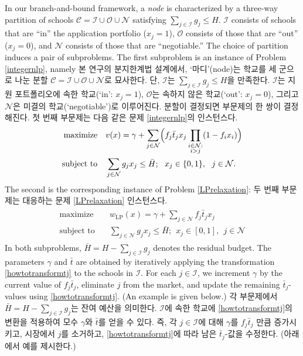 \documentclass[11pt]{article} %
\theoremstyle{definition}
\theoremstyle{definition}
\begin{document}
\ifen In our branch-and-bound framework, a \emph{node} is characterized by a three-way partition of schools $\mathcal{C}= \mathcal{I} \cup \mathcal{O} \cup \mathcal{N}$ satisfying $\sum_{j \in \mathcal{I}} g_j \leq H$. $\mathcal{I}$ consists of schools that are ``in'' the application portfolio ($x_j = 1$), $\mathcal{O}$ consists of those that are ``out'' ($x_j = 0$), and $\mathcal{N}$ consists of those that are ``negotiable.'' 
The choice of partition induces a pair of subproblems. The first subproblem is an instance of Problem \ref{integernlp}, namely
\else
본 연구의 분지한계법 설계에서, `마디'(node)는 학교를 세 군으로 나눈 분할 $\mathcal{C}= \mathcal{I} \cup \mathcal{O} \cup \mathcal{N}$로 묘사한다. 단, $\mathcal{I}$는 $\sum_{j \in \mathcal{I}} g_j \leq H$을 만족한다. $\mathcal{I}$는 지원 포트폴리오에 속한 학교(`in': $x_j = 1$), $\mathcal{O}$는 속하지 않은 학교(`out': $x_j = 0$), 그리고 $\mathcal{N}$은 미결의 학교(`negotiable')로 이루어진다. 분할이 결정되면 부문제의 한 쌍이 결정해진다. 첫 번째 부문제는 다음 같은 문제 \ref{integernlp}의 인스턴스다.
\fi
\begin{align} \label{nodenlpsubproblem}
\begin{split}
\text{maximize}\quad &  v(x) = \gamma + \sum_{j \in \mathcal{N}} \Bigl(f_j \bar t_j x_j \prod_{\substack{i \in \mathcal{N}:\\i > j}} (1 - f_{i} x_i) \Bigr)\\
\text{subject to}\quad & \sum_{j \in \mathcal{N}} g_j x_j \leq \bar H; ~~ x_j \in \{0, 1\},~~j \in \mathcal{N}.
\end{split}
\end{align}
\ifen The second is the corresponding instance of Problem \ref{LPrelaxation}:
\else 두 번째 부문제는 대응하는 문제 \ref{LPrelaxation} 인스턴스다.\fi
\begin{align} \label{nodelprelaxation}
\begin{split}
\text{maximize}\quad &  w_{\mathrm{LP}}(x)= \gamma + \sum_{j \in \mathcal{N}}  f_j \bar t_j  x_j \\
\text{subject to}\quad & \sum_{j \in \mathcal{N}} g_j x_j \leq \bar H; ~~ x_j \in [0, 1],~~j \in \mathcal{N}
\end{split}
\end{align}
\ifen
In both subproblems, $\bar H = H - \sum_{j\in \mathcal{I}} g_j$ denotes the residual budget. The parameters $\gamma$ and $\bar t$ are obtained by iteratively applying the transformation \eqref{howtotransformtj} to the schools in $\mathcal{I}$. For each $j\in \mathcal{I}$,  we increment $\gamma$ by the current value of $f_j \bar t_j$, eliminate $j$ from the market, and update the remaining $\bar t_j$-values using \eqref{howtotransformtj}. (An example is given below.)
\else
각 부문제에서 $\bar H = H - \sum_{j\in \mathcal{I}} g_j$는 잔여 예산을 의미한다. $\mathcal{I}$에 속한 학교에 \eqref{howtotransformtj}의 변환을 적용하여 모수 $\gamma$와 $\bar t$를 얻을 수 있다. 즉, 각 $j\in \mathcal{I}$에 대해 $\gamma$를 $f_j \bar t_j$ 만큼 증가시키고, 시장에서 $j$를 소거하고, \eqref{howtotransformtj}에 따라 남은 $\bar t_j$-값을 수정한다. (아래에서 예를 제시한다.)
\fi
\end{document}
